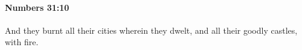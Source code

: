 
		\paragraph{Numbers 31:10} %
			\label{NUMBERS-31-10}

			And they burnt all their cities wherein they dwelt, and all their goodly castles, with fire.


